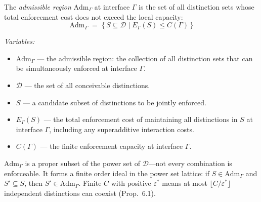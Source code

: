 \documentclass[11pt]{article}
\newcommand{\Adm}{\mathrm{Adm}}
\begin{document}
\begin{tcolorbox}[apfbox, title={Definition (Admissibility)}]
The \emph{admissible region} $\Adm_\Gamma$ at interface $\Gamma$ is the set of all distinction sets whose total enforcement cost does not exceed the local capacity:
\begin{equation}
\Adm_\Gamma \;=\; \bigl\{\, S \subseteq \mathcal{D} \;\big|\; E_\Gamma(S) \le C(\Gamma) \,\bigr\}
\end{equation}

\smallskip\noindent\textit{Variables:}
\begin{itemize}[nosep,leftmargin=2em]
\item $\Adm_\Gamma$ --- the admissible region: the collection of all distinction sets that can be simultaneously enforced at interface $\Gamma$.
\item $\mathcal{D}$ --- the set of all conceivable distinctions.
\item $S$ --- a candidate subset of distinctions to be jointly enforced.
\item $E_\Gamma(S)$ --- the total enforcement cost of maintaining all distinctions in $S$ at interface $\Gamma$, including any superadditive interaction costs.
\item $C(\Gamma)$ --- the finite enforcement capacity at interface $\Gamma$.
\end{itemize}

\smallskip\noindent
$\Adm_\Gamma$ is a proper subset of the power set of $\mathcal{D}$---not every combination is enforceable.  It forms a finite order ideal in the power set lattice: if $S \in \Adm_\Gamma$ and $S' \subseteq S$, then $S' \in \Adm_\Gamma$.  Finite $C$ with positive $\varepsilon^*$ means at most $\lfloor C/\varepsilon^* \rfloor$ independent distinctions can coexist (Prop.~6.1).
\end{tcolorbox}
\end{document}
